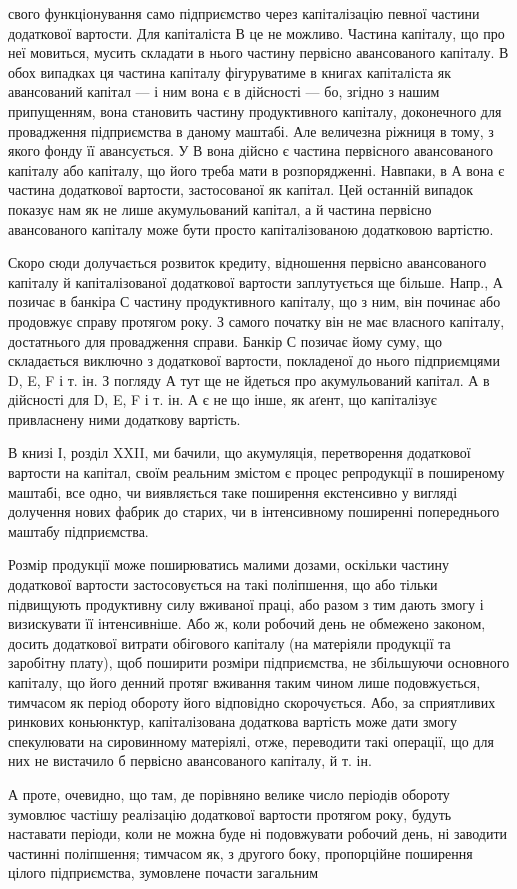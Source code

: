 \parcont{}  %
свого функціонування само підприємство через капіталізацію певної частини
додаткової вартости. Для капіталіста В це не можливо. Частина
капіталу, що про неї мовиться, мусить складати в нього частину первісно
авансованого капіталу. В обох випадках ця частина капіталу фігуруватиме
в книгах капіталіста як авансований капітал — і ним вона є в
дійсності — бо, згідно з нашим припущенням, вона становить частину
продуктивного капіталу, доконечного для провадження підприємства
в даному маштабі. Але величезна ріжниця в тому, з якого фонду
її авансується. У В вона дійсно є частина первісного авансованого
капіталу або капіталу, що його треба мати в розпорядженні.
Навпаки, в А вона є частина додаткової вартости, застосованої як
капітал. Цей останній випадок показує нам як не лише акумульований
капітал, а й частина первісно авансованого капіталу може бути просто
капіталізованою додатковою вартістю.

Скоро сюди долучається розвиток кредиту, відношення первісно авансованого
капіталу й капіталізованої додаткової вартости заплутується
ще більше. Напр., А позичає в банкіра С частину продуктивного капіталу,
що з ним, він починає або продовжує справу протягом року. З
самого початку він не має власного капіталу, достатнього для провадження
справи. Банкір С позичає йому суму, що складається виключно з
додаткової вартости, покладеної до нього підприємцями D, E, F і т. ін.
З погляду А тут ще не йдеться про акумульований капітал. А в дійсності
для D, E, F і т. ін. А є не що інше, як аґент, що капіталізує привласнену
ними додаткову вартість.

В книзі І, розділ XXII, ми бачили, що акумуляція, перетворення додаткової
вартости на капітал, своїм реальним змістом є процес репродукції
в поширеному маштабі, все одно, чи виявляється таке поширення
екстенсивно у вигляді долучення нових фабрик до старих, чи в інтенсивному
поширенні попереднього маштабу підприємства.

Розмір продукції може поширюватись малими дозами, оскільки
частину додаткової вартости застосовується на такі поліпшення, що або
тільки підвищують продуктивну силу вживаної праці, або разом з тим
дають змогу і визискувати її інтенсивніше. Або ж, коли робочий день не
обмежено законом, досить додаткової витрати обігового капіталу (на матеріяли
продукції та заробітну плату), щоб поширити розміри підприємства,
не збільшуючи основного капіталу, що його денний протяг вживання
таким чином лише подовжується, тимчасом як період обороту його
відповідно скорочується. Або, за сприятливих ринкових коньюнктур, капіталізована
додаткова вартість може дати змогу спекулювати на сировинному
матеріялі, отже, переводити такі операції, що для них не вистачило
б первісно авансованого капіталу, й т. ін.

А проте, очевидно, що там, де порівняно велике число періодів обороту
зумовлює частішу реалізацію додаткової вартости протягом року,
будуть наставати періоди, коли не можна буде ні подовжувати робочий
день, ні заводити частинні поліпшення; тимчасом як, з другого боку, пропорційне
поширення цілого підприємства, зумовлене почасти загальним
\parbreak{}  %
